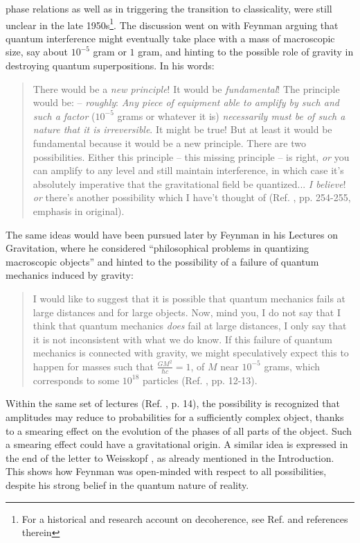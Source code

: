 \documentclass{ws-procs961x669}            %
\begin{document}
phase relations as well as in triggering the transition to
classicality, were still unclear in the late 1950s\footnote{For a
historical and research account on decoherence, see Ref.
 and references therein}. The discussion went on
with Feynman arguing that quantum interference might eventually
take place with a mass of macroscopic size, say about $10^{-5}$
gram or $1$ gram, and hinting to the possible role of gravity in
destroying quantum superpositions. In his words:
%
\begin{quote}
There would be a \textit{new principle}! It would be
\textit{fundamental}! The principle would be: -- \textit{roughly}:
\textit{Any piece of equipment able to amplify by such and such a
factor} ($10^{-5}$ grams or whatever it is) \textit{necessarily
must be of such a nature that it is irreversible}. It might be
true! But at least it would be fundamental because it would be a
new principle. There are two possibilities. Either this principle
-- this missing principle -- is right, \textit{or} you can amplify
to any level and still maintain interference, in which case it's
absolutely imperative that the gravitational field be quantized...
\textit{I believe}! \textit{or} there's another possibility which
I have't thought of (Ref. , pp. 254-255,
emphasis in original).
\end{quote}
%
The same ideas would have been pursued later by Feynman in his
Lectures on Gravitation\cite{Feynman:1996kb}, where he considered
``philosophical problems in quantizing macroscopic objects'' and
hinted to the possibility of a failure of quantum mechanics
induced by gravity:
%
\begin{quote}
I would like to suggest that it is possible that quantum mechanics
fails at large distances and for large objects. Now, mind you, I
do not say that I think that quantum mechanics \textit{does} fail
at large distances, I only say that it is not inconsistent with
what we do know. If this failure of quantum mechanics is connected
with gravity, we might speculatively expect this to happen for
masses such that $\frac{GM^2}{\hbar c}=1$, of $M$ near $10^{-5}$
grams, which corresponds to some $10^{18}$ particles (Ref.
, pp. 12-13).
\end{quote}
%
Within the same set of lectures (Ref. , p.
14), the possibility is recognized that amplitudes may reduce to
probabilities for a sufficiently complex object, thanks to a
smearing effect on the evolution of the phases of all parts of the
object. Such a smearing effect could have a gravitational origin.
A similar idea is expressed in the end of the letter to Weisskopf
\cite{WeisskopfLetter}, as already mentioned in the Introduction.
This shows how Feynman was open-minded with respect to all
possibilities, despite his strong belief in the quantum nature of
reality.
\end{document}
